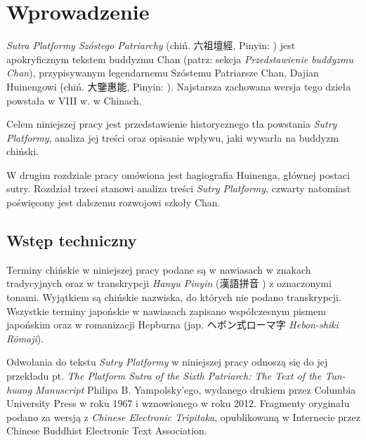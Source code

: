 \chapter*{Wprowadzenie}
\setcounter{chapter}{1}
\textit{Sutra Platformy Szóstego Patriarchy} (chiń. 六祖壇經, Pinyin: ) jest apokryficznym tekstem buddyzmu Chan (patrz: sekcja \textit{Przedstawienie buddyzmu Chan}), przypisywanym legendarnemu Szóstemu Patriarsze Chan, Dajian Huinengowi (chiń. 大鑒惠能, Pinyin: ). Najstarsza zachowana wersja tego dzieła powstała w VIII w. w Chinach.

Celem niniejszej pracy jest przedstawienie historycznego tła powstania \textit{Sutry Platformy}, analiza jej treści oraz opisanie wpływu, jaki wywarła na buddyzm chiński.

W drugim rozdziale pracy omówiona jest hagiografia Huinenga, głównej postaci sutry.
Rozdział trzeci stanowi analiza treści \textit{Sutry Platformy}, czwarty natomiast poświęcony jest dalszemu rozwojowi szkoły Chan.

\section{Wstęp techniczny}
Terminy chińskie w niniejszej pracy podane są w nawiasach w znakach tradycyjnych oraz w transkrypcji \textit{Hanyu Pinyin} (漢語拼音 ) z oznaczonymi tonami. Wyjątkiem są chińskie nazwiska, do których nie podano transkrypcji.
Wszystkie terminy japońskie w nawiasach zapisano współczesnym pismem japońskim oraz w romanizacji Hepburna (jap. {\ipaexgothic ヘボン式ローマ字} \textit{Hebon-shiki Rōmaji}).

Odwołania do tekstu \textit{Sutry Platformy} w niniejszej pracy odnoszą się do jej przekładu pt. \textit{The Platform Sutra of the Sixth Patriarch: The Text of the Tun-huang Manuscript} Philipa B. Yampolsky'ego, wydanego drukiem przez Columbia University Press w roku 1967 i wznowionego w roku 2012.
Fragmenty oryginału podano za wersją z \textit{Chinese Electronic Tripitaka}, opublikowaną w Internecie przez Chinese Buddhist Electronic Text Association.
%

